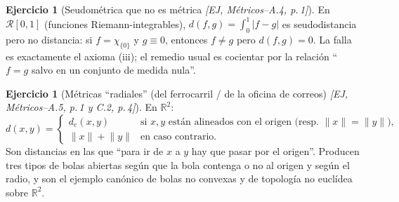 \documentclass[11pt,a4paper]{article}
\theoremstyle{definition}
\newtheorem{ejercicio}[definicion]{Ejercicio}
\theoremstyle{plain}
\newcommand{\fnt}[1]{{\normalfont\small\itshape\color{gray!150!black}[#1]}}
\newcommand{\R}{\mathbb{R}}
\newcommand{\norm}[1]{\lVert #1 \rVert}
\begin{document}
\begin{ejercicio}[Seudométrica que no es métrica \fnt{EJ, Métricos--A.4, p.\,1}]
En $\mathcal{R}[0,1]$ (funciones Riemann-integrables), $d(f,g)=\int_0^1|f-g|$ es seudodistancia pero no distancia: si $f=\chi_{\{0\}}$ y $g\equiv 0$, entonces $f\ne g$ pero $d(f,g)=0$. La falla es exactamente el axioma (iii); el remedio usual es cocientar por la relación ``$f=g$ salvo en un conjunto de medida nula''.
\end{ejercicio}

\begin{ejercicio}[Métricas ``radiales'' (del ferrocarril / de la oficina de correos) \fnt{EJ, Métricos--A.5, p.\,1 y C.2, p.\,4}]
En $\R^2$:
\[
d(x,y)=\begin{cases} d_e(x,y) & \text{si } x,y \text{ están alineados con el origen (resp.\ } \norm{x}=\norm{y}),\\[2pt]
\norm{x}+\norm{y} & \text{en caso contrario.}\end{cases}
\]
Son distancias en las que ``para ir de $x$ a $y$ hay que pasar por el origen''. Producen tres tipos de bolas abiertas según que la bola contenga o no al origen y según el radio, y son el ejemplo canónico de bolas no convexas y de topología no euclídea sobre $\R^2$.
\end{ejercicio}
\end{document}
